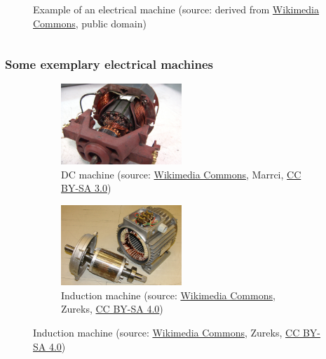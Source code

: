 \begin{frame}
\begin{columns}
\begin{column}{0.5\textwidth}
\begin{figure}
				\caption{Example of an electrical machine (source: derived from \href{https://commons.wikimedia.org/wiki/File:TMW_50906_Schnittmodell_einer_Drehstrommaschine_(Asynchronmaschine).jpg}{Wikimedia Commons}, public domain)}
			\end{figure}
		\end{column}
		\end{columns}
\end{frame}

\begin{frame}
	\frametitle{Some exemplary electrical machines}
	\begin{figure}
		\centering
		\begin{subfigure}[b]{0.49\textwidth}
			\centering
			\includegraphics[width=0.5\textwidth]{fig/lec01/Universalmotor.JPG}
			\caption{DC machine (source: \href{https://commons.wikimedia.org/wiki/File:Universalmotor_3.JPG}{Wikimedia Commons}, Marrci, \href{https://creativecommons.org/licenses/by-sa/3.0/deed.en}{CC BY-SA 3.0})}
		\end{subfigure}
		\hfill
		\begin{subfigure}[b]{0.49\textwidth}
			\centering
			\includegraphics[width=0.5\textwidth]{fig/lec01/Induction_motor_stator_rotor.JPG}
			\caption{Induction machine (source: \href{https://commons.wikimedia.org/wiki/File:Stator_and_rotor_by_Zureks.JPG}{Wikimedia Commons}, Zureks, \href{https://creativecommons.org/licenses/by-sa/4.0/deed.en}{CC BY-SA 4.0})}
		\end{subfigure}

\end{figure}
\end{frame}
